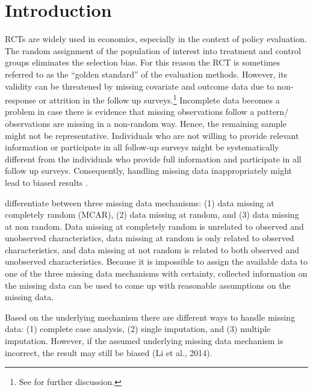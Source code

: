 \section{Introduction}


\acp{RCT} are widely used in economics, especially in the context of policy evaluation. The random assignment of the population of interest into treatment and control groups eliminates the selection bias. For this reason the \ac{RCT} is sometimes referred to as the ``golden standard'' of the evaluation methods. 
However, its validity can be threatened by missing covariate and outcome data due to non-response or attrition in the follow up surveys.\footnote{See \cite{angrist_mostly_2008} for further discussion.} Incomplete data becomes a problem in case there is evidence that missing observations follow a pattern/ observations are missing in a non-random way. Hence, the remaining sample might not be representative. Individuals who are not willing to provide relevant information or participate in all follow-up surveys might be systematically different from the individuals who provide full information and participate in all follow up surveys. Consequently, handling missing data inappropriately might lead to biased results \citep{heckman1976common, lee2009training, kling2007experimental}. 

\cite{little1989analysis} differentiate between three missing data mechanisms: (1) data missing at completely random (MCAR), (2) data missing at random, and (3) data missing at non random. Data missing at completely random is unrelated to observed and unobserved characteristics, data missing at random is only related to observed characteristics, and data missing at not random is related to both observed and unobserved characteristics. Because it is impossible to assign the available data to one of the three missing data mechanisms with certainty, collected information on the missing data can be used to come up with reasonable assumptions on the missing data. 

Based on the underlying mechanism there are different ways to handle missing data: (1) complete case analysis, (2) single imputation, and (3) multiple imputation. However, if the assumed underlying missing data mechanism is incorrect, the result may still be biased (Li et al., 2014). 

